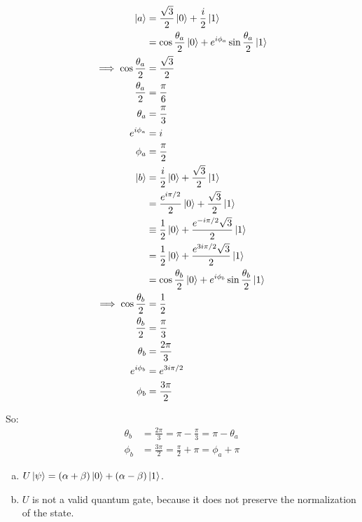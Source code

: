 \documentclass[12pt]{extarticle}
\begin{document}
\begin{align*}
\ket{a} & = \frac{\sqrt{3}}{2}\ket{0} + \frac{i}{2}\ket{1} \\
& = \cos{\frac{\theta_a}{2}}\ket{0} + e^{i\phi_a}\sin{\frac{\theta_a}{2}}\ket{1} \\
\implies \cos{\frac{\theta_a}{2}} & = \frac{\sqrt{3}}{2} \\
\frac{\theta_a}{2} & = \frac{\pi}{6} \\
\theta_a & = \frac{\pi}{3} \\
e^{i\phi_a} & = i \\
\phi_a & = \frac{\pi}{2} \\
\ket{b} & = \frac{i}{2}\ket{0} + \frac{\sqrt{3}}{2}\ket{1} \\
& = \frac{e^{i\pi/2}}{2}\ket{0} + \frac{\sqrt{3}}{2}\ket{1} \\
& \equiv \frac{1}{2}\ket{0} + \frac{e^{-i\pi/2}\sqrt{3}}{2}\ket{1} \\
& = \frac{1}{2}\ket{0} + \frac{e^{3i\pi/2}\sqrt{3}}{2}\ket{1} \\
& = \cos{\frac{\theta_b}{2}}\ket{0} + e^{i\phi_b}\sin{\frac{\theta_b}{2}}\ket{1} \\
\implies \cos{\frac{\theta_b}{2}} & = \frac{1}{2} \\
\frac{\theta_b}{2} & = \frac{\pi}{3} \\
\theta_b & = \frac{2\pi}{3} \\
e^{i\phi_b} & = e^{3i\pi/2} \\
\phi_b & = \frac{3\pi}{2} \\
\end{align*}

So:
\begin{align*}
\theta_b & = \frac{2\pi}{3} = \pi - \frac{\pi}{3} = \pi - \theta_a \\
\phi_b & = \frac{3\pi}{2} = \frac{\pi}{2} + \pi = \phi_a + \pi
\end{align*}



\begin{enumerate}[(a)]
\item $U\ket{\psi} = (\alpha+\beta)\ket{0} + (\alpha-\beta)\ket{1}$.
\item $U$ is not a valid quantum gate, because it does not preserve the normalization of the state.
\end{enumerate}
\end{document}
